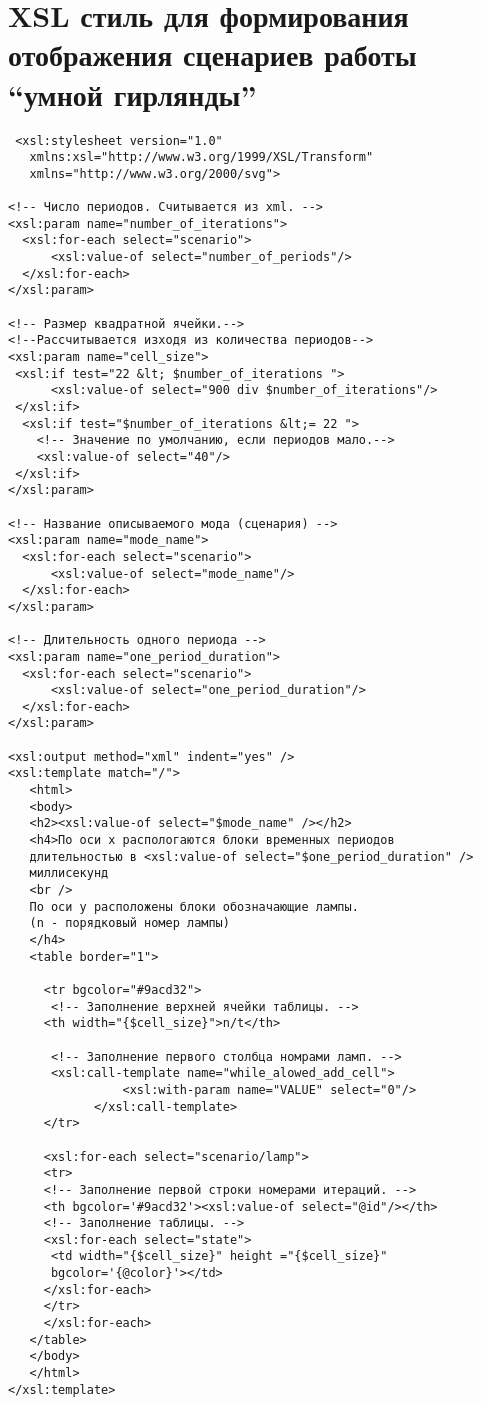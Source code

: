 \chapter{XSL стиль для формирования отображения сценариев работы ``умной гирлянды''}
\label{cha:appendix1}


\begin{verbatim}
 <xsl:stylesheet version="1.0"
   xmlns:xsl="http://www.w3.org/1999/XSL/Transform"
   xmlns="http://www.w3.org/2000/svg">

<!-- Число периодов. Считывается из xml. -->
<xsl:param name="number_of_iterations">
  <xsl:for-each select="scenario">
      <xsl:value-of select="number_of_periods"/>
  </xsl:for-each>
</xsl:param>

<!-- Размер квадратной ячейки.--> 
<!--Рассчитывается изходя из количества периодов-->
<xsl:param name="cell_size">
 <xsl:if test="22 &lt; $number_of_iterations ">
      <xsl:value-of select="900 div $number_of_iterations"/>
 </xsl:if>
  <xsl:if test="$number_of_iterations &lt;= 22 ">
    <!-- Значение по умолчанию, если периодов мало.-->
    <xsl:value-of select="40"/>
 </xsl:if>
</xsl:param>

<!-- Название описываемого мода (сценария) -->
<xsl:param name="mode_name">
  <xsl:for-each select="scenario">
      <xsl:value-of select="mode_name"/>
  </xsl:for-each>
</xsl:param>

<!-- Длительность одного периода -->
<xsl:param name="one_period_duration">
  <xsl:for-each select="scenario">
      <xsl:value-of select="one_period_duration"/>
  </xsl:for-each>
</xsl:param>

<xsl:output method="xml" indent="yes" />
<xsl:template match="/">
   <html>
   <body>
   <h2><xsl:value-of select="$mode_name" /></h2>
   <h4>По оси x распологаются блоки временных периодов
   длительностью в <xsl:value-of select="$one_period_duration" /> 
   миллисекунд 
   <br />
   По оси y расположены блоки обозначающие лампы. 
   (n - порядковый номер лампы)
   </h4>
   <table border="1">
     
     <tr bgcolor="#9acd32">
      <!-- Заполнение верхней ячейки таблицы. -->
     <th width="{$cell_size}">n/t</th>
      
      <!-- Заполнение первого столбца номрами ламп. -->
      <xsl:call-template name="while_alowed_add_cell">
				<xsl:with-param name="VALUE" select="0"/>
			</xsl:call-template>
     </tr>

     <xsl:for-each select="scenario/lamp">
     <tr>
     <!-- Заполнение первой строки номерами итераций. -->
     <th bgcolor='#9acd32'><xsl:value-of select="@id"/></th>
     <!-- Заполнение таблицы. -->
     <xsl:for-each select="state">
      <td width="{$cell_size}" height ="{$cell_size}" 
      bgcolor='{@color}'></td>
     </xsl:for-each>
     </tr>
     </xsl:for-each>
   </table>
   </body>
   </html>
</xsl:template>


\end{verbatim}
